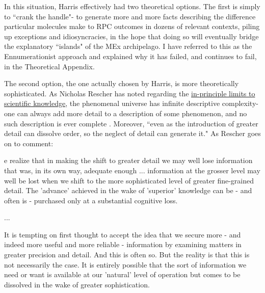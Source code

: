 In this situation, Harris effectively had two theoretical options. The first is simply to ``crank the handle"- to generate more and more facts describing the difference particular molecules make to RPC outcomes in dozens of relevant contexts, piling up exceptions and idiosyncracies, in the hope that doing so will eventually bridge the explanatory ``islands" of the MEx archipelago. I have referred to this as the Ennumerationist approach and explained why it has failed, and continues to fail, in the Theoretical Appendix.

The second option, the one actually chosen by Harris, is more theoretically sophisticated. As Nicholas Rescher has noted regarding the \hyperref[theorylimits]{in-principle limits to scientific knowledge}, the phenomenal universe has infinite descriptive complexity- one can always add more detail to a description of some phenomenon, and no such description is ever complete \cite[p.22-9]{Rescher2000}. Moreover, ``even as the introduction of greater detail can dissolve order, so the neglect of detail can generate it." \cite[p.62]{Rescher2000} As Rescher goes on to comment:

\begin{longquote}
[W]e realize that in making the shift to greater detail we may well lose information that was, in its own way, adequate enough ... information at the grosser level may well be lost when we shift to the more sophisticated level of greater fine-grained detail. The 'advance' achieved in the wake of 'superior' knowledge can be - and often is - purchased only at a substantial cognitive loss.

...

It is tempting on first thought to accept the idea that we secure more - and indeed more useful and more reliable - information by examining matters in greater precision and detail. And this is often so. But the reality is that this is not necessarily the case. It is entirely possible that the sort of information we need or want is available at our 'natural' level of operation but comes to be dissolved in the wake of greater sophistication.
\cite[p.65-6]{Rescher2000}
\end{longquote}

